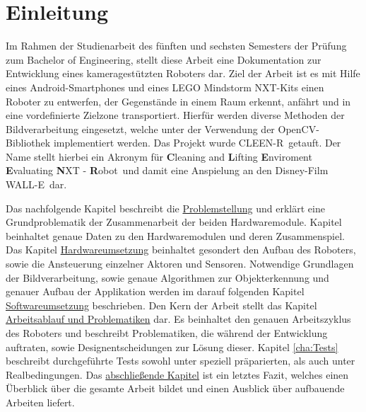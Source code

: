 \chapter{Einleitung}
\label{cha:einleitung}

Im Rahmen der Studienarbeit des fünften und sechsten Semesters der Prüfung zum Bachelor of Engineering, stellt diese Arbeit eine Dokumentation zur Entwicklung eines kameragestützten Roboters dar. Ziel der Arbeit ist es mit Hilfe eines Android-Smartphones und eines LEGO Mindstorm NXT-Kits einen Roboter zu entwerfen, der Gegenstände in einem Raum erkennt, anfährt und in eine vordefinierte Zielzone transportiert. Hierfür werden diverse Methoden der Bildverarbeitung eingesetzt, welche unter der Verwendung der OpenCV-Bibliothek \cite{opencv_library} implementiert werden. Das Projekt wurde \glqq CLEEN-R\grqq\ getauft. Der Name stellt hierbei ein Akronym für \glqq \textbf{C}leaning and \textbf{L}ifting \textbf{E}nviroment \textbf{E}valuating \textbf{N}XT - \textbf{R}obot\grqq\ und damit eine Anspielung an den Disney-Film \glqq WALL-E\grqq\ dar.

Das nachfolgende Kapitel beschreibt die \hyperref[cha:Problemstellung]{Problemstellung} und erklärt eine Grundproblematik der Zusammenarbeit der beiden Hardwaremodule. Kapitel  beinhaltet genaue Daten zu den Hardwaremodulen und deren Zusammenspiel. Das Kapitel \hyperref[cha:robot]{Hardwareumsetzung} beinhaltet gesondert den Aufbau des Roboters, sowie die Ansteuerung einzelner Aktoren und Sensoren. Notwendige Grundlagen der Bildverarbeitung, sowie genaue Algorithmen zur Objekterkennung und genauer Aufbau der Applikation werden im darauf folgenden Kapitel \hyperref[cha:Software]{Softwareumsetzung} beschrieben. Den Kern der Arbeit stellt das Kapitel \hyperref[cha:Workloop]{Arbeitsablauf und Problematiken} dar. Es beinhaltet den genauen Arbeitszyklus des Roboters und beschreibt Problematiken, die während der Entwicklung auftraten, sowie Designentscheidungen zur Lösung dieser. Kapitel \ref{cha:Tests} beschreibt durchgeführte Tests sowohl unter speziell präparierten, als auch unter Realbedingungen. Das \hyperref[cha:Fazit]{abschließende Kapitel} ist ein letztes Fazit, welches einen Überblick über die gesamte Arbeit bildet und einen Ausblick über aufbauende Arbeiten liefert.




